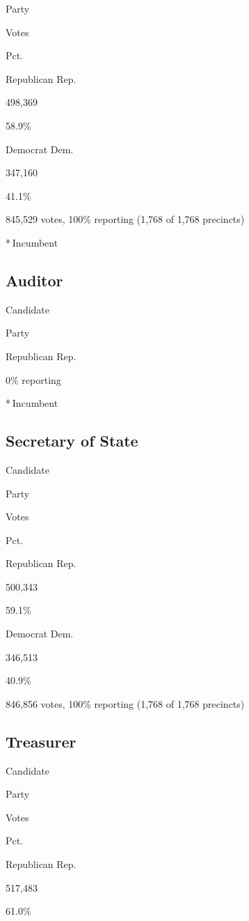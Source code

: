 Party

Votes

Pct.

Republican Rep.

498,369

58.9\%

Democrat Dem.

347,160

41.1\%

845,529 votes, 100\% reporting (1,768 of 1,768 precincts)

* Incumbent

\hypertarget{auditor}{%
\subsection{Auditor}\label{auditor}}

Candidate

Party

Republican Rep.

0\% reporting

* Incumbent

\hypertarget{secretary-of-state}{%
\subsection{Secretary of State}\label{secretary-of-state}}

Candidate

Party

Votes

Pct.

Republican Rep.

500,343

59.1\%

Democrat Dem.

346,513

40.9\%

846,856 votes, 100\% reporting (1,768 of 1,768 precincts)

\hypertarget{treasurer}{%
\subsection{Treasurer}\label{treasurer}}

Candidate

Party

Votes

Pct.

Republican Rep.

517,483

61.0\%

